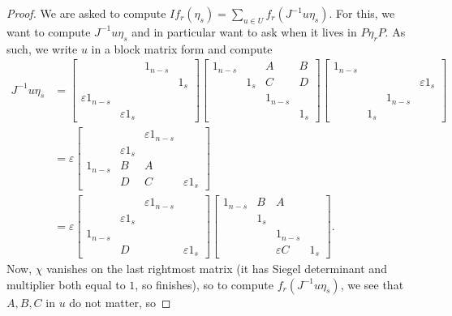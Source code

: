\begin{proof}
	We are asked to compute $If_r(\eta_s)=\sum_{u\in U}f_r\left(J^{-1}u\eta_s\right)$. For this, we want to compute $J^{-1}u\eta_s$ and in particular want to ask when it lives in $P\eta_rP$. As such, we write $u$ in a block matrix form and compute
	\begin{align*}
		J^{-1}u\eta_s &= \begin{bmatrix}
			&& 1_{n-s} \\ &&& 1_s \\
			\varepsilon1_{n-s} \\ & \varepsilon1_s
		\end{bmatrix}\begin{bmatrix}
			1_{n-s} && A & B \\ & 1_s & C & D \\
			&& 1_{n-s} \\ &&& 1_s
		\end{bmatrix}\begin{bmatrix}
			1_{n-s} \\ &&& \varepsilon1_s \\
			&& 1_{n-s} \\ & 1_s
		\end{bmatrix} \\
		&= \varepsilon\begin{bmatrix}
			&& \varepsilon1_{n-s} \\ & \varepsilon1_s \\
			1_{n-s} & B & A \\ & D & C & \varepsilon1_s
		\end{bmatrix} \\
		&= \varepsilon\begin{bmatrix}
			&& \varepsilon1_{n-s} \\ & \varepsilon1_s \\
			1_{n-s} &   &   \\ & D &   & \varepsilon1_s
		\end{bmatrix}\begin{bmatrix}
			1_{n-s} & B & A \\ & 1_s \\
			&& 1_{n-s} \\ && \varepsilon C & 1_s
		\end{bmatrix}.
	\end{align*}
	Now, $\chi$ vanishes on the last rightmost matrix (it has Siegel determinant and multiplier both equal to $1$, so  finishes), so to compute $f_r\left(J^{-1}u\eta_s\right)$, we see that $A,B,C$ in $u$ do not matter, so

\end{proof}
